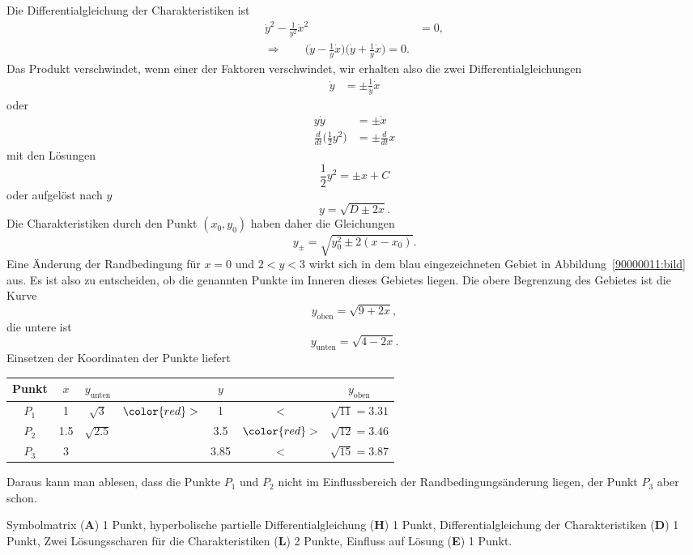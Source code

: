 \begin{loesung}
Die Differentialgleichung der Charakteristiken ist
\begin{align*}
\dot y^2-\frac{1}{y^2}\dot x^2&=0,\\
\Rightarrow\qquad
\biggl(\dot y-\frac1y\dot x\biggr)\biggl(\dot y +\frac1y\dot x\biggr)=0.
\end{align*}
Das Produkt verschwindet, wenn einer der Faktoren verschwindet, wir erhalten
also die zwei Differentialgleichungen
\begin{align*}
\dot y&=\pm \frac1y \dot x
\end{align*}
oder
\begin{align*}
y\dot y&=\pm \dot x
\\
\frac{d}{dt}\biggl(\frac12y^2\biggr)&=\pm\frac{d}{dt} x
\end{align*}
mit den Lösungen
\[
\frac12y^2=\pm x + C
\]
oder aufgelöst nach $y$
\begin{equation}
y=\sqrt{D\pm 2x}.
\end{equation}
Die Charakteristiken durch den Punkt $(x_0,y_0)$ haben daher die Gleichungen
\[
y_\pm=\sqrt{y_0^2\pm 2(x-x_0)}.
\]
Eine Änderung der Randbedingung für $x=0$ und $2<y<3$ wirkt sich 
in dem blau eingezeichneten Gebiet in Abbildung~\ref{90000011:bild} aus.
Es ist also zu entscheiden, ob die genannten Punkte im Inneren dieses
Gebietes liegen. Die obere Begrenzung des Gebietes ist die
Kurve
\[
y_{\text{oben}} = \sqrt{9+2x},
\]
die untere ist
\[
y_{\text{unten}} = \sqrt{4-2x}.
\]
Einsetzen der Koordinaten der Punkte liefert
\begin{center}
\begin{tabular}{|c|c|ccccc|}
\hline
Punkt&$x$&$y_{\text{unten}}$&               &$y$ &              & $y_{\text{oben}}$\\
\hline
$P_1$&1  &$\sqrt{3}  $      &$\color{red}>$ & 1  &     $<$      & $\sqrt{11}=3.31$ \\
$P_2$&1.5&$\sqrt{2.5}$      &               &3.5 &$\color{red}>$& $\sqrt{12}=3.46$ \\
$P_3$&3  &                  &               &3.85&     $<$      & $\sqrt{15}=3.87$ \\
\hline
\end{tabular}
\end{center}
Daraus kann man ablesen, dass die Punkte $P_1$ und $P_2$ nicht im Einflussbereich
der Randbedingungsänderung liegen, der Punkt $P_3$ aber schon.
\end{loesung}

\begin{bewertung}
Symbolmatrix ({\bf A}) 1 Punkt,
hyperbolische partielle Differentialgleichung ({\bf H}) 1 Punkt,
Differentialgleichung der Charakteristiken ({\bf D}) 1 Punkt,
Zwei Lösungsscharen für die Charakteristiken ({\bf L}) 2 Punkte,
Einfluss auf Lösung ({\bf E}) 1 Punkt.
\end{bewertung}



